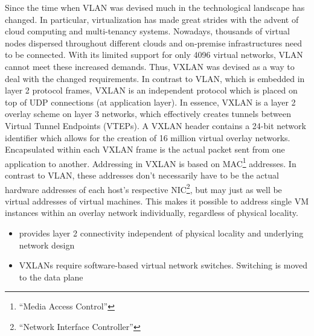 Since the time when VLAN was devised much in the technological landscape has changed. In particular, virtualization has made great strides with the advent of cloud computing and multi-tenancy systems. Nowadays, thousands of virtual nodes dispersed throughout different clouds and on-premise infrastructures need to be connected. With its limited support for only 4096 virtual networks, VLAN cannot meet these increased demands. Thus, VXLAN was devised as a way to deal with the changed requirements. In contrast to VLAN, which is embedded in layer 2 protocol frames, VXLAN is an independent protocol which is placed on top of UDP connections (at application layer). In essence, VXLAN is a layer 2 overlay scheme on layer 3 networks, which effectively creates tunnels between Virtual Tunnel Endpoints (VTEPs). A VXLAN header contains a 24-bit network identifier which allows for the creation of 16 million virtual overlay networks. Encapsulated within each VXLAN frame is the actual packet sent from one application to another. Addressing in VXLAN is based on MAC\footnote{``Media Access Control''} addresses. In contrast to VLAN, these addresses don't necessarily have to be the actual hardware addresses of each host's respective NIC\footnote{``Network Interface Controller''}, but may just as well be virtual addresses of virtual machines. This makes it possible to address single VM instances within an overlay network individually, regardless of physical locality. 


\begin{itemize}
	\item provides layer 2 connectivity independent of physical locality and underlying network design
	\item VXLANs require software-based virtual network switches. Switching is moved to the data plane
\end{itemize}


